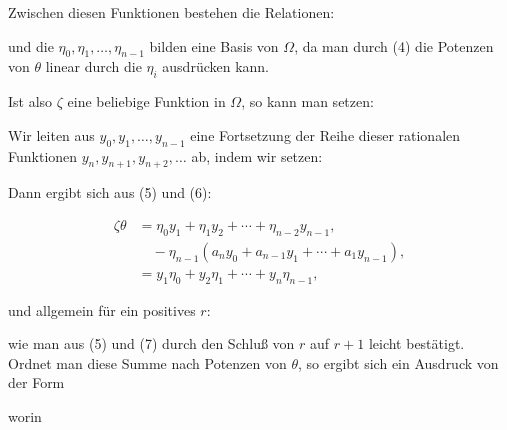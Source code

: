 
Zwischen diesen Funktionen bestehen die Relationen:


und die $\eta_0, \eta_1, \ldots, \eta_{n-1}$ bilden eine Basis von $\Omega$, da man durch
(4) die Potenzen von $\theta$ linear durch die $\eta_i$ ausdr\"ucken kann.

Ist also $\zeta$ eine beliebige Funktion in $\Omega$, so kann man setzen:


Wir leiten aus $y_0, y_1, \ldots, y_{n-1}$ eine Fortsetzung der Reihe dieser rationalen
Funktionen $y_n, y_{n+1}, y_{n+2}, \ldots$ ab, indem wir setzen:


Dann ergibt sich aus (5) und (6):

\[
\begin{aligned}
\zeta\theta &= \eta_0 y_1 + \eta_1 y_2 + \cdots + \eta_{n-2}y_{n-1}, \\
&\quad - \eta_{n-1}(a_n y_0 + a_{n-1}y_1 + \cdots + a_1 y_{n-1}), \\
&= y_1\eta_0 + y_2\eta_1 + \cdots + y_n\eta_{n-1},
\end{aligned}
\]

und allgemein f\"ur ein positives $r$:


wie man aus (5) und (7) durch den Schlu\ss{} von $r$ auf $r+1$ leicht best\"atigt.
Ordnet man diese Summe nach Potenzen von $\theta$, so ergibt sich ein Ausdruck von der
Form


worin

